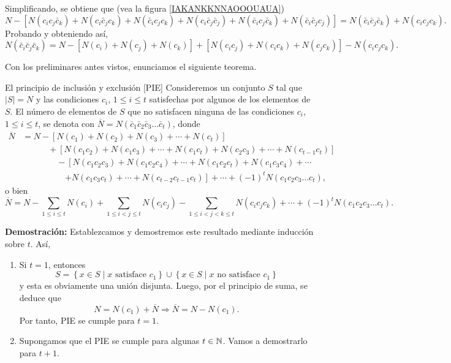 Simplificando, se obtiene que (vea la figura \ref{IAKANKKNNAOOOUAUA})
$$N - [N(c_i c_j \bar{c}_k) + N(c_i \bar{c}_j c_k) + N(\bar{c}_i c_j c_k) + N(c_i \bar{c}_j \bar{c}_j) + N(\bar{c}_i c_j \bar{c}_k) + N(\bar{c}_i \bar{c}_j c_j)] = N(\bar{c}_i \bar{c}_j \bar{c}_k) + N(c_i c_j c_k).$$
Probando y obteniendo así,
$$
N\left(\bar{c}_i \bar{c}_j \bar{c}_k\right) = N -\left[N\left(c_i\right) + N\left(c_j\right) + N\left(c_k\right)\right] + \left[N\left(c_i c_j\right) + N\left(c_i c_k\right) + N\left(c_j c_k\right)\right] - N\left(c_i c_j c_k\right) .
$$

Con los preliminares antes vistos, enunciamos el siguiente teorema.

\newpage

\begin{theorem}{El principio de inclusión y exclusión [PIE]}{}
    Consideremos un conjunto $S$ tal que $|S|=N$ y las condiciones $c_i$, $1 \leq i \leq t$ satisfechas por algunos de los elementos de $S$. El número de elementos de $S$ que no satisfacen ninguna de las condiciones $c_i$, $1 \leq i \leq t$, se denota con $\overline{N}=N\left(\bar{c}_1 \bar{c}_2 \bar{c}_3 \dots \bar{c}_t\right)$, donde
    \begin{align*}
        \overline{N} & = N-\left[N\left(c_1\right)+N\left(c_2\right)+N\left(c_3\right)+\cdots+N\left(c_t\right)\right] \\
        & \quad\quad\quad +\left[N\left(c_1 c_2\right)+N\left(c_1 c_3\right)+\cdots+N\left(c_1 c_t\right)+N\left(c_2 c_3\right)+\cdots+N\left(c_{t-1} c_t\right)\right] \\
        & \quad\quad\quad\quad -\left[N\left(c_1 c_2 c_3\right)+N\left(c_1 c_2 c_4\right)+\cdots+N\left(c_1 c_2 c_t\right)+N\left(c_1 c_3 c_4\right)+\cdots\right. \\
        & \quad\quad\quad\quad\quad  \left.+N\left(c_1 c_3 c_t\right)+\cdots+N\left(c_{t-2} c_{t-1} c_t\right)\right]+\cdots+(-1)^t N\left(c_1 c_2 c_3 \ldots c_t\right),
    \end{align*}
    o bien
    \begin{equation}
        \overline{N} = N-\sum_{1 \leq i \leq t} N\left(c_i\right)+\sum_{1 \leq i<j \leq t} N\left(c_i c_j\right)-\sum_{1 \leq i<j<k \leq t} N\left(c_i c_j c_k\right)+\cdots +(-1)^t N\left(c_1 c_2 c_3 \dots c_t\right). \label{JAISKKANNJSISJSJ}
    \end{equation}

    \tcblower
    \textbf{\color{jblueleft}Demostración:} Establezcamos y demostremos este resultado mediante inducción sobre $t$. Así,
    \begin{enumerate}[label=\roman*)]
        \item Si $t = 1$, entonces
        $$S = \left\{x \in S \mid x \text{ satisface } c_1 \right\} \cup \left\{x \in S \mid x \text{ no satisface } c_1 \right\}$$
        y esta es obviamente una unión disjunta. Luego, por el principio de suma, se deduce que
        $$N = N(c_1) + \overline{N} \Longrightarrow \overline{N} = N - N(c_1).$$
        Por tanto, PIE se cumple para $t = 1$.
        \item Supongamos que el PIE se cumple para algunas $t \in \NN$. Vamos a demostrarlo para $t + 1$.


\end{enumerate}
\end{theorem}

